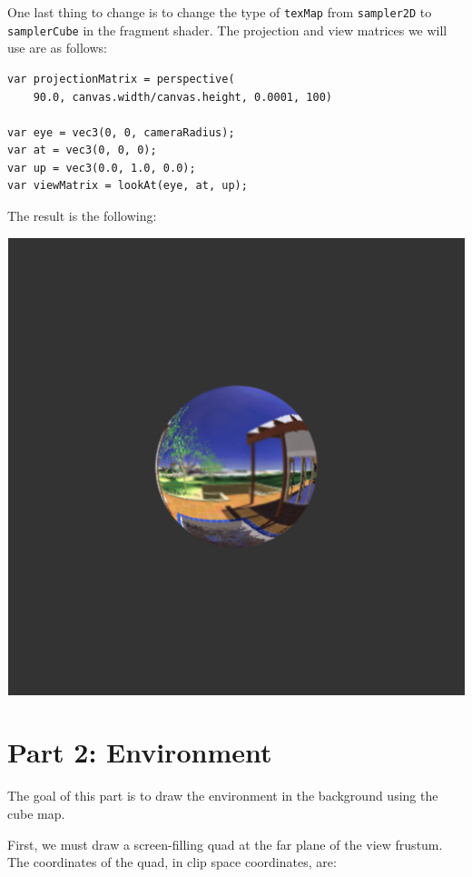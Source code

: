 \documentclass[12pt]{article}
\begin{document}
One last thing to change is to change the type of \texttt{texMap} from \texttt{sampler2D} to \texttt{samplerCube} in the fragment shader. The projection and view matrices we will use are as follows:

\begin{verbatim}
var projectionMatrix = perspective(
    90.0, canvas.width/canvas.height, 0.0001, 100)

var eye = vec3(0, 0, cameraRadius);
var at = vec3(0, 0, 0);
var up = vec3(0.0, 1.0, 0.0);
var viewMatrix = lookAt(eye, at, up);
\end{verbatim}

The result is the following:

\begin{center}
\includegraphics[scale=0.5]{images/part1}
\end{center}

\newpage

\section*{Part 2: Environment}

The goal of this part is to draw the environment in the background using the cube map.

First, we must draw a screen-filling quad at the far plane of the view frustum. The coordinates of the quad, in clip space coordinates, are:
\end{document}
